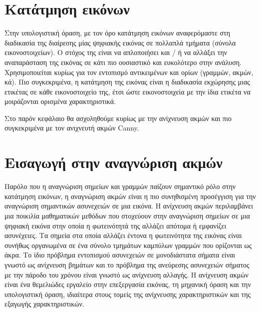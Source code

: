 \section{Κατάτμηση εικόνων}

Στην υπολογιστική όραση, με τον όρο κατάτμηση εικόνων αναφερόμαστε στη διαδικασία της διαίρεσης μίας ψηφιακής εικόνας σε πολλαπλά τμήματα (σύνολα εικονοστοιχείων). Ο στόχος της είναι να απλοποιήσει και / ή να αλλάξει την αναπαράσταση της εικόνας σε κάτι πιο ουσιαστικό και ευκολότερο στην ανάλυση. Χρησιμοποιείται κυρίως για τον εντοπισμό αντικειμένων και ορίων (γραμμών, ακμών, κά). Πιο συγκεκριμένα, η κατάτμηση της εικόνας είναι η διαδικασία εκχώρησης μιας ετικέτας σε κάθε εικονοστοιχείο της, έτσι ώστε εικονοστοιχεία με την ίδια ετικέτα να μοιράζονται ορισμένα χαρακτηριστικά.

Στο παρόν κεφάλαιο θα ασχοληθούμε κυρίως με την ανίχνευση ακμών και πιο συγκεκριμένα με τον ανιχνευτή ακμών Canny.

\section{Εισαγωγή στην αναγνώριση ακμών}

Παρόλο που η αναγνώριση σημείων και γραμμών παίζουν σημαντικό ρόλο στην κατάτμηση εικόνων, η αναγνώριση ακμών είναι η πιο συνηθισμένη προσέγγιση για την αναγνώριση σημαντικών ασυνεχειών σε μια εικόνα. Η ανίχνευση ακμών περιλαμβάνει μια ποικιλία μαθηματικών μεθόδων που στοχεύουν στην αναγνώριση σημείων σε μια ψηφιακή εικόνα στην οποία η φωτεινότητά της αλλάζει απότομα ή εμφανίζει ασυνέχειες. Τα σημεία στα οποία αλλάζει έντονα η φωτεινότητα της εικόνας είναι συνήθως οργανωμένα σε ένα σύνολο τμημάτων καμπύλων γραμμών που ορίζονται ως άκρα. Το ίδιο πρόβλημα εντοπισμού ασυνεχειών σε μονοδιάστατα σήματα είναι γνωστό ως ανίχνευση βημάτων και το πρόβλημα της ανεύρεσης ασυνεχειών σήματος με την πάροδο του χρόνου είναι γνωστό ως ανίχνευση αλλαγής. Η ανίχνευση ακμών είναι ένα θεμελιώδες εργαλείο στην επεξεργασία εικόνας, τη μηχανική όραση και την υπολογιστική όραση, ιδιαίτερα στους τομείς της ανίχνευσης χαρακτηριστικών και της εξαγωγής χαρακτηριστικών.


